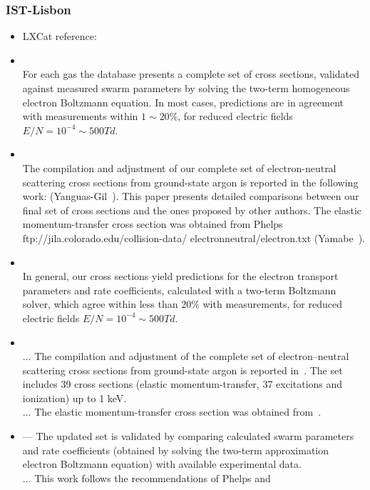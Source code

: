 \subsubsection{IST-Lisbon}
\begin{itemize}
\item LXCat reference: \cite{Pitchford2013,Pitchford2017,Alves2014}
\item \cite{Pitchford2017}\\
For each gas the database presents a complete set of cross sections,
validated against measured swarm parameters by solving
the two-term homogeneous electron Boltzmann equation.
In most cases, predictions are in agreement with
measurements within $1\sim20\%$, for reduced electric fields
$E/N = 10^{-4} \sim 500 Td$.
\item \cite{Pitchford2013}\\
The compilation and adjustment of our complete set of
electron-neutral scattering cross sections from ground-state
argon is reported in the following work: (Yanguas-Gil~\cite{Alves2005}).
This paper presents detailed comparisons between
our final set of cross sections and the ones proposed by other authors.
The elastic momentum-transfer cross section was
obtained from Phelps ftp://jila.colorado.edu/collision-data/
electronneutral/electron.txt (Yamabe~\cite{Yamabe1983}).
\item \cite{Alves2014}\\
In general, our cross sections yield predictions for the electron transport parameters and rate coefficients,
calculated with a two-term Boltzmann solver, which agree within less than $20\%$ with measurements,
for reduced electric fields $E/N=10^{-4}\sim 500Td$.
\item \cite{Alves2014}\\
$\ldots$ The compilation and adjustment of the complete set of electron–neutral scattering cross sections from
ground-state argon is reported in~\cite{Alves2005}. The set includes 39 cross sections (elastic momentum-transfer,
37 excitations and ionization) up to 1 keV.\\
$\ldots$ The elastic momentum-transfer cross section was obtained from~\cite{Yamabe1983}.
\item \cite{Alves2005} --- The updated set is
validated by comparing calculated swarm parameters and rate coefficients
(obtained by solving the two-term approximation electron Boltzmann
equation) with available experimental data.\\
$\ldots$ This work follows the recommendations of Phelps and

\end{itemize}
